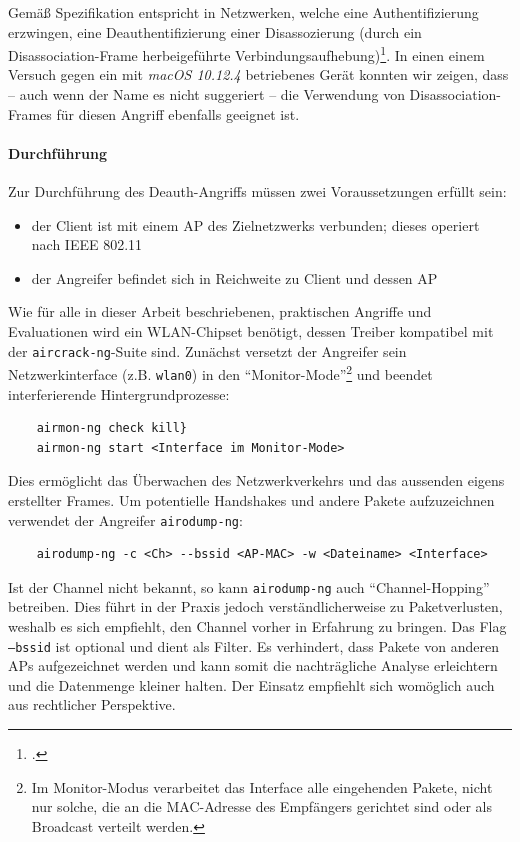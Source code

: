 Gemäß Spezifikation entspricht in Netzwerken, welche eine Authentifizierung erzwingen, eine Deauthentifizierung einer Disassozierung (durch ein Disassociation-Frame herbeigeführte Verbindungsaufhebung)\footcite[S. 74, S. 442]{ieee802.11}. In einen einem Versuch gegen ein mit \textit{macOS 10.12.4} betriebenes Gerät konnten wir zeigen, dass -- auch wenn der Name es nicht suggeriert -- die Verwendung von Disassociation-Frames für diesen Angriff ebenfalls geeignet ist.

\paragraph{Durchführung}
Zur Durchführung des Deauth-Angriffs müssen zwei Voraussetzungen erfüllt sein: 
\begin{itemize}
	\item der Client ist mit einem AP des Zielnetzwerks verbunden; dieses operiert nach IEEE 802.11
	\item der Angreifer befindet sich in Reichweite zu Client und dessen AP
\end{itemize}

Wie für alle in dieser Arbeit beschriebenen, praktischen Angriffe und Evaluationen wird ein WLAN-Chipset benötigt, dessen Treiber kompatibel mit der \texttt{aircrack-ng}-Suite sind. 
Zunächst versetzt der Angreifer sein Netzwerkinterface (z.B. \texttt{wlan0}) in den \enquote{Monitor-Mode}\footnote{Im Monitor-Modus verarbeitet das Interface alle eingehenden Pakete, nicht nur solche, die an die MAC-Adresse des Empfängers gerichtet sind oder als Broadcast verteilt werden.} und beendet interferierende Hintergrundprozesse:

\begin{Verbatim}
	airmon-ng check kill}
	airmon-ng start <Interface im Monitor-Mode>
\end{Verbatim}

Dies ermöglicht das Überwachen des Netzwerkverkehrs und das aussenden eigens erstellter Frames.
Um potentielle Handshakes und andere Pakete aufzuzeichnen verwendet der Angreifer \texttt{airodump-ng}:
\begin{Verbatim}
	airodump-ng -c <Ch> --bssid <AP-MAC> -w <Dateiname> <Interface>
\end{Verbatim}
Ist der Channel nicht bekannt, so kann \texttt{airodump-ng} auch \enquote{Channel-Hopping} betreiben. 
Dies führt in der Praxis jedoch verständlicherweise zu Paketverlusten, weshalb es sich empfiehlt, den Channel vorher in Erfahrung zu bringen. Das Flag \texttt{--bssid} ist optional und dient als Filter. Es verhindert, dass Pakete von anderen APs aufgezeichnet werden und kann somit die nachträgliche Analyse erleichtern und die Datenmenge kleiner halten. Der Einsatz empfiehlt sich womöglich auch aus rechtlicher Perspektive.


